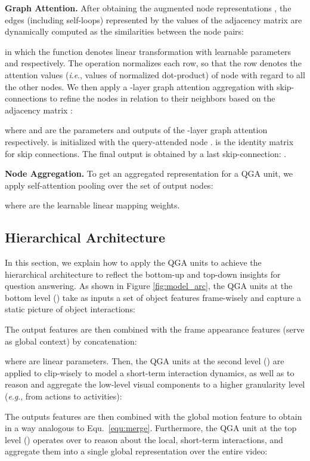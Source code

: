\documentclass[letterpaper]{article} \usepackage{aaai21}  \usepackage{times}  \usepackage{helvet} \usepackage{courier}  \usepackage[hyphens]{url}  \usepackage{graphicx} \urlstyle{rm} \def\UrlFont{\rm}  \usepackage{natbib}  \usepackage{caption} \usepackage{color, colortbl}
\newcommand{\ie}{\textit{i}.\textit{e}.}
\newcommand{\eg}{\textit{e}.\textit{g}.}
\begin{document}
\textbf{Graph Attention.}
After obtaining the augmented node representations , the edges (including self-loops) represented by the values of the adjacency matrix  are dynamically computed as the similarities between the node pairs:


in which the function  denotes linear transformation with learnable parameters  and  respectively. The  operation normalizes each row, so that the  row  denotes the attention values (\ie, values of normalized dot-product) of node  with regard to all the other nodes. We then apply a -layer graph attention aggregation with skip-connections to refine the nodes in relation to their neighbors based on the adjacency matrix : 

where  and  are the parameters and outputs of the -layer graph attention respectively.  is initialized with the query-attended node .  is the identity matrix for skip connections. The final output is obtained by a last skip-connection: .

\textbf{Node Aggregation.} To get an aggregated representation  for a QGA unit, we apply self-attention pooling \cite{lee2019self} over the set of output nodes:

where  are the learnable linear mapping weights. 

\subsection{Hierarchical Architecture}
In this section, we explain how to apply the QGA units to achieve the hierarchical architecture to reflect the bottom-up and top-down insights for question answering. As shown in Figure \ref{fig:model_arc}, the QGA units at the bottom level () take as inputs a set of object features frame-wisely and capture a static picture of object interactions:

The output features  are then combined with the frame appearance features  (serve as global context) by concatenation:

where  are linear parameters. Then, the QGA units at the second level () are applied to  clip-wisely to model a short-term interaction dynamics, as well as to reason and aggregate the low-level visual components to a higher granularity level (\eg, from actions to activities):

\noindent The outputs features  are then combined with the global motion feature  to obtain  in a way analogous to Equ.~\ref{equ:merge}. Furthermore, the QGA unit at the top level () operates over  to reason about the local, short-term interactions, and aggregate them into a single global representation  over the entire video:
\end{document}
